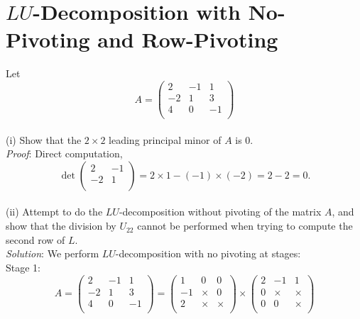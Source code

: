 \documentclass[paper=a4, fontsize=11pt]{scrartcl} %
\numberwithin{equation}{section} %
\numberwithin{figure}{section} %
\numberwithin{table}{section} %
\begin{document}
\section{$LU$-Decomposition with No-Pivoting and Row-Pivoting}
Let
$$
A = \begin{pmatrix}
2 & -1 & 1 \\
-2 & 1 & 3 \\
4 & 0 & -1 \\
\end{pmatrix}
$$\\
(i) Show that the $2\times 2$ leading principal minor of $A$ is 0.\\
\textit{Proof}: Direct computation,
$$
\det\begin{pmatrix}
2 & -1 \\
-2 & 1 \\
\end{pmatrix} =  2\times 1- (-1)\times(-2) = 2-2 = 0.
$$\\

(ii) Attempt to do the $LU$-decomposition without pivoting of the matrix $A$, and show that the division by $U_{22}$ cannot be performed when trying to compute
the second row of $L$.\\
\textit{Solution}: We perform $LU$-decomposition with no pivoting at stages:\\
\newline
Stage 1:
$$
A = \begin{pmatrix}
2 & -1 & 1 \\
-2 & 1 & 3 \\
4 & 0 & -1 \\
\end{pmatrix}
=
\begin{pmatrix}
1 & 0 & 0 \\
-1 & \times & 0 \\
2 & \times & \times \\
\end{pmatrix}
\times
\begin{pmatrix}
2 & -1 & 1 \\
0 & \times & \times \\
0 & 0 & \times \\
\end{pmatrix}
$$
\end{document}
